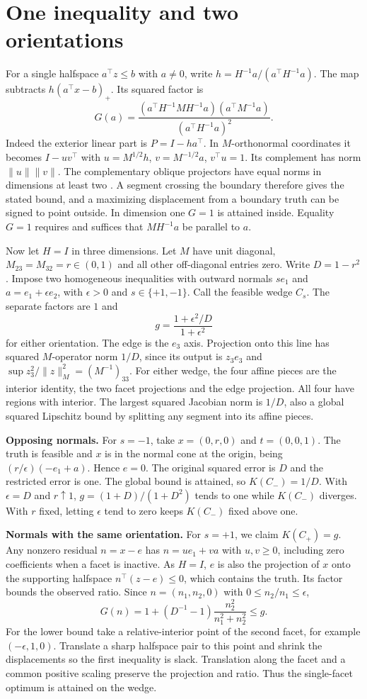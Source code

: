 \documentclass[11pt]{article}
\begin{document}
\newpage
\section{One inequality and two orientations}
For a single halfspace $a^\top z\le b$ with $a\ne0$, write $h=H^{-1}a/(a^\top H^{-1}a)$. The map subtracts $h(a^\top x-b)_+$. Its squared factor is
\[
 G(a)=\frac{(a^\top H^{-1} M H^{-1}a)(a^\top M^{-1}a)}
                {(a^\top H^{-1}a)^2}.
\]
Indeed the exterior linear part is $P=I-ha^\top$. In $M$-orthonormal coordinates it becomes $I-uv^\top$ with $u=M^{1/2}h$, $v=M^{-1/2}a$, $v^\top u=1$. Its complement has norm $\|u\|\|v\|$. The complementary oblique projectors have equal norms in dimensions at least two \cite{szyld}. A segment crossing the boundary therefore gives the stated bound, and a maximizing displacement from a boundary truth can be signed to point outside. In dimension one $G=1$ is attained inside. Equality $G=1$ requires and suffices that $MH^{-1}a$ be parallel to $a$.

Now let $H=I$ in three dimensions. Let $M$ have unit diagonal, $M_{23}=M_{32}=r\in(0,1)$ and all other off-diagonal entries zero. Write $D=1-r^2$. Impose two homogeneous inequalities with outward normals $s e_1$ and $a=e_1+\epsilon e_2$, with $\epsilon>0$ and $s\in\{+1,-1\}$. Call the feasible wedge $C_s$. The separate factors are $1$ and
\[
       g=\frac{1+\epsilon^2/D}{1+\epsilon^2}
\]
for either orientation. The edge is the $e_3$ axis. Projection onto this line has squared $M$-operator norm $1/D$, since its output is $z_3e_3$ and $\sup z_3^2/\|z\|_M^2=(M^{-1})_{33}$. For either wedge, the four affine pieces are the interior identity, the two facet projections and the edge projection. All four have regions with interior. The largest squared Jacobian norm is $1/D$, also a global squared Lipschitz bound by splitting any segment into its affine pieces.

\textbf{Opposing normals.} For $s=-1$, take $x=(0,r,0)$ and $t=(0,0,1)$. The truth is feasible and $x$ is in the normal cone at the origin, being $(r/\epsilon)(-e_1+a)$. Hence $e=0$. The original squared error is $D$ and the restricted error is one. The global bound is attained, so $K(C_-)=1/D$. With $\epsilon=D$ and $r\uparrow1$, $g=(1+D)/(1+D^2)$ tends to one while $K(C_-)$ diverges. With $r$ fixed, letting $\epsilon$ tend to zero keeps $K(C_-)$ fixed above one.

\newpage
\textbf{Normals with the same orientation.} For $s=+1$, we claim $K(C_+)=g$. Any nonzero residual $n=x-e$ has $n=u e_1+v a$ with $u,v\ge0$, including zero coefficients when a facet is inactive. As $H=I$, $e$ is also the projection of $x$ onto the supporting halfspace $n^\top(z-e)\le0$, which contains the truth. Its factor bounds the observed ratio. Since $n=(n_1,n_2,0)$ with $0\le n_2/n_1\le\epsilon$,
\[
    G(n)=1+(D^{-1}-1)\frac{n_2^2}{n_1^2+n_2^2}\le g .
\]
For the lower bound take a relative-interior point of the second facet, for example $(-\epsilon,1,0)$. Translate a sharp halfspace pair to this point and shrink the displacements so the first inequality is slack. Translation along the facet and a common positive scaling preserve the projection and ratio. Thus the single-facet optimum is attained on the wedge.
\end{document}
